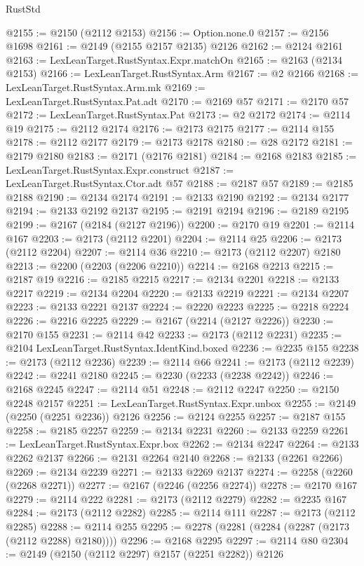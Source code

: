 \begin{lexlean}{RustStd}
\begin{coremodule}
{\begin{coremodule}
{{{{{{{{{{{{{{{{@2155 := @2150 (@2112 @2153)
@2156 := Option.none.{0}
@2157 := @2156 @1698
@2161 := @2149 (@2155 @2157 @2135) @2126
@2162 := @2124 @2161
@2163 := LexLeanTarget.RustSyntax.Expr.matchOn
@2165 := @2163 (@2134 @2153)
@2166 := LexLeanTarget.RustSyntax.Arm
@2167 := @2 @2166
@2168 := LexLeanTarget.RustSyntax.Arm.mk
@2169 := LexLeanTarget.RustSyntax.Pat.adt
@2170 := @2169 @57
@2171 := @2170 @57
@2172 := LexLeanTarget.RustSyntax.Pat
@2173 := @2 @2172
@2174 := @2114 @19
@2175 := @2112 @2174
@2176 := @2173 @2175
@2177 := @2114 @155
@2178 := @2112 @2177
@2179 := @2173 @2178
@2180 := @28 @2172
@2181 := @2179 @2180
@2183 := @2171 (@2176 @2181)
@2184 := @2168 @2183
@2185 := LexLeanTarget.RustSyntax.Expr.construct
@2187 := LexLeanTarget.RustSyntax.Ctor.adt @57
@2188 := @2187 @57
@2189 := @2185 @2188
@2190 := @2134 @2174
@2191 := @2133 @2190
@2192 := @2134 @2177
@2194 := @2133 @2192 @2137
@2195 := @2191 @2194
@2196 := @2189 @2195
@2199 := @2167 (@2184 (@2127 @2196))
@2200 := @2170 @19
@2201 := @2114 @167
@2203 := @2173 (@2112 @2201)
@2204 := @2114 @25
@2206 := @2173 (@2112 @2204)
@2207 := @2114 @36
@2210 := @2173 (@2112 @2207) @2180
@2213 := @2200 (@2203 (@2206 @2210))
@2214 := @2168 @2213
@2215 := @2187 @19
@2216 := @2185 @2215
@2217 := @2134 @2201
@2218 := @2133 @2217
@2219 := @2134 @2204
@2220 := @2133 @2219
@2221 := @2134 @2207
@2223 := @2133 @2221 @2137
@2224 := @2220 @2223
@2225 := @2218 @2224
@2226 := @2216 @2225
@2229 := @2167 (@2214 (@2127 @2226))
@2230 := @2170 @155
@2231 := @2114 @42
@2233 := @2173 (@2112 @2231)
@2235 := @2104 LexLeanTarget.RustSyntax.IdentKind.boxed
@2236 := @2235 @155
@2238 := @2173 (@2112 @2236)
@2239 := @2114 @66
@2241 := @2173 (@2112 @2239)
@2242 := @2241 @2180
@2245 := @2230 (@2233 (@2238 @2242))
@2246 := @2168 @2245
@2247 := @2114 @51
@2248 := @2112 @2247
@2250 := @2150 @2248 @2157
@2251 := LexLeanTarget.RustSyntax.Expr.unbox
@2255 := @2149 (@2250 (@2251 @2236)) @2126
@2256 := @2124 @2255
@2257 := @2187 @155
@2258 := @2185 @2257
@2259 := @2134 @2231
@2260 := @2133 @2259
@2261 := LexLeanTarget.RustSyntax.Expr.box
@2262 := @2134 @2247
@2264 := @2133 @2262 @2137
@2266 := @2131 @2264 @2140
@2268 := @2133 (@2261 @2266)
@2269 := @2134 @2239
@2271 := @2133 @2269 @2137
@2274 := @2258 (@2260 (@2268 @2271))
@2277 := @2167 (@2246 (@2256 @2274))
@2278 := @2170 @167
@2279 := @2114 @222
@2281 := @2173 (@2112 @2279)
@2282 := @2235 @167
@2284 := @2173 (@2112 @2282)
@2285 := @2114 @111
@2287 := @2173 (@2112 @2285)
@2288 := @2114 @255
@2295 := @2278 (@2281 (@2284 (@2287 (@2173 (@2112 @2288) @2180))))
@2296 := @2168 @2295
@2297 := @2114 @80
@2304 := @2149 (@2150 (@2112 @2297) @2157 (@2251 @2282)) @2126
}}}}}}}}}}}}}}}}
\end{coremodule}}
\end{coremodule}
\end{lexlean}

